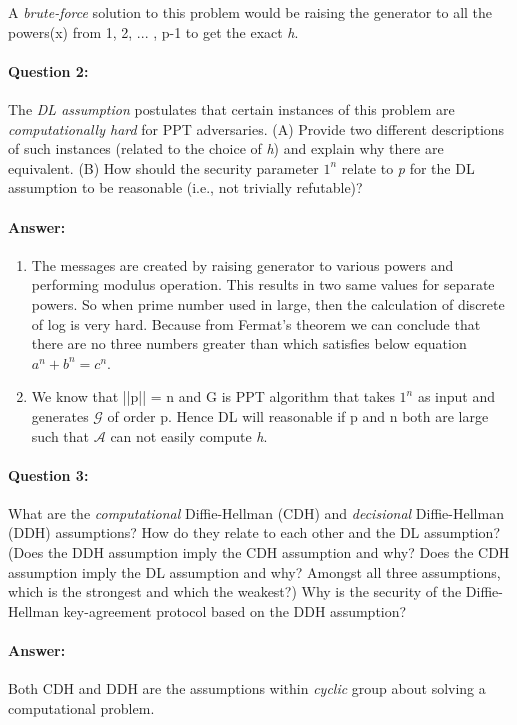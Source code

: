 \documentclass{article}
\begin{document}
        A \emph{brute-force} solution to this problem would be raising the generator to all the powers(x) from 1, 2, ... , p-1 to get the exact \emph{h}. 
        
    \paragraph{Question 2:} The \emph{DL assumption} postulates that certain instances of this problem are \emph{computationally hard} for PPT adversaries. (A) Provide two different descriptions of such instances (related to the choice of \emph{h}) and explain why there are equivalent. (B) How should the security parameter $1^n$ relate to \emph{p} for the DL assumption to be reasonable (i.e., not trivially refutable)?
    \paragraph{Answer: \newline}
        \begin{enumerate}
            \item The messages are created by raising generator to various powers and performing modulus operation. This results in two same values for separate powers. So when prime number used in large, then the calculation of discrete of log is very hard. Because from Fermat's theorem we can conclude that there are no three numbers greater than which satisfies below equation $a^n + b^n = c^n$.
            \item We know that ||p|| = n and G is PPT algorithm that takes $1^n$ as input and generates $\mathcal{G}$ of order p. Hence DL will reasonable if p and n both are large such that $\mathcal{A}$ can not easily compute \emph{h}.
        \end{enumerate}
        
    \paragraph{Question 3:} What are the \emph{computational} Diffie-Hellman (CDH) and \emph{decisional} Diffie-Hellman (DDH) assumptions? How do they relate to each other and the DL assumption? (Does the DDH assumption imply the CDH assumption and why? Does the CDH assumption imply the DL assumption and why? Amongst all three assumptions, which is the strongest and which the weakest?) Why is the security of the Diffie-Hellman key-agreement protocol based on the DDH assumption?
    \paragraph{Answer: \newline}
        Both CDH and DDH are the assumptions within \emph{cyclic} group about solving a computational problem. \newline
        
\end{document}
